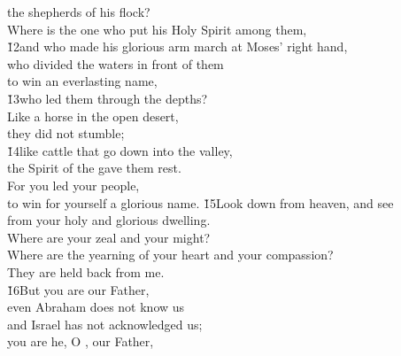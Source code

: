 \begin{poetry}
\poemll    the shepherds of his flock? \\
\poeml Where is the one who put his Holy Spirit among them, \\
\poeml \v{12}and who made his glorious arm march at Moses' right hand, \\
\poeml who divided the waters in front of them \\
\poemll    to win an everlasting name, \\
\poeml \v{13}who led them through the depths? \\
\poemll    Like a horse in the open desert, \\
\poemlll       they did not stumble; \\
\poeml \v{14}like cattle that go down into the valley, \\
\poemll    the Spirit of the  gave them rest. \\
\poeml For you led your people, \\
\poemll    to win for yourself a glorious name.
\poeml \v{15}Look down from heaven, and see \\
\poemll    from your holy and glorious dwelling. \\
\poeml Where are your zeal and your might? \\
\poemll    Where are the yearning of your heart and your compassion? \\
\poemlll       They are held back from me. \\
\poeml \v{16}But you are our Father, \\
\poemll    even Abraham does not know us \\
\poemlll       and Israel has not acknowledged us; \\
\poeml you are he, O , our Father, \\

\end{poetry}
